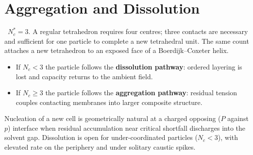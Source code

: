 \section{Aggregation and Dissolution}
\label{sec:pathways}

\begin{definition}
\derived\ $N_c^*=3$. A regular tetrahedron requires four centres; three contacts
are necessary and sufficient for one particle to complete a new tetrahedral unit.
The same count attaches a new tetrahedron to an exposed face of a Boerdijk--Coxeter
helix.
\end{definition}

\begin{itemize}
\item If $N_c<3$ the particle follows the \textbf{dissolution pathway}: ordered
layering is lost and capacity returns to the ambient field.
\item If $N_c\ge 3$ the particle follows the \textbf{aggregation pathway}: residual
tension couples contacting membranes into larger composite structure.
\end{itemize}

Nucleation of a new cell is geometrically natural at a charged opposing ($P$ against
$p$) interface when residual accumulation near critical shortfall discharges into
the solvent gap. Dissolution is open for under-coordinated particles ($N_c<3$),
with elevated rate on the periphery and under solitary caustic spikes.
